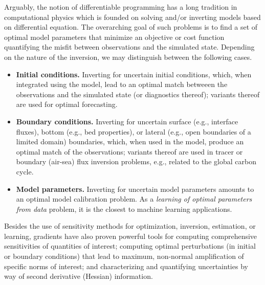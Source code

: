 Arguably, the notion of differentiable programming has a long tradition in  computational physics which is founded on solving and/or inverting models based  on differential equation.
The overarching goal of such problems is to find a set of optimal model parameters that minimize an objective or cost function quantifying the misfit between observations and the simulated state.
Depending on the nature of the 
inversion, we may distinguish between the following cases.
\begin{itemize}
    \item \textbf{Initial conditions.} Inverting for uncertain initial conditions, which, when integrated using the model, lead to an optimal match betweeen the observations and the simulated state (or diagnostics thereof); variants thereof are used for optimal forecasting.
    \item \textbf{Boundary conditions.} Inverting for uncertain surface (e.g., interface fluxes), bottom (e.g., bed properties), or lateral (e.g., open boundaries of a limited domain) boundaries, which, when used in the model, produce an optimal match of the observations; variants thereof are used in tracer or boundary (air-sea) flux inversion problems, e.g., related to the global carbon cycle.
    \item \textbf{Model parameters.} Inverting for uncertain model parameters amounts to an optimal model calibration problem. As a \textit{learning of optimal parameters from data} problem, it is the closest to machine learning applications.
\end{itemize}
Besides the use of sensitivity methods for optimization, inversion, estimation, or learning, gradients have also proven powerful tools for computing comprehensive sensitivities of quantities of interest; computing optimal perturbations (in initial or boundary conditions) that lead to maximum, non-normal amplification of specific norms of interest; and
characterizing and quantifying uncertainties by way of second derivative (Hessian) information.


